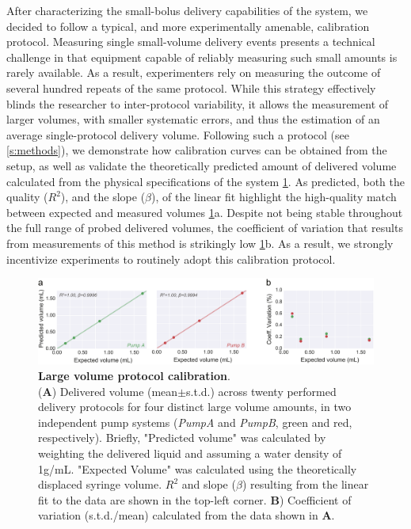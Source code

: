 After characterizing the small-bolus delivery capabilities of the system, we decided to follow a typical, and more experimentally amenable, calibration protocol. Measuring single small-volume delivery events presents a technical challenge in that equipment capable of reliably measuring such small amounts is rarely available. As a result, experimenters rely on measuring the outcome of several hundred repeats of the same protocol. While this strategy effectively blinds the researcher to inter-protocol variability, it allows the measurement of larger volumes, with smaller systematic errors, and thus the estimation of an average single-protocol delivery volume. Following such a protocol (see \ref{s:methods}), we demonstrate how calibration curves can be obtained from the setup, as well as validate the theoretically predicted amount of delivered volume calculated from the physical specifications of the system \ref{fig:LargeVolumeCalibration}. As predicted, both the quality  ($R^2$), and the slope ($\beta$), of the linear fit highlight the high-quality match between expected and measured volumes \ref{fig:LargeVolumeCalibration}a. Despite not being stable throughout the full range of probed delivered volumes, the coefficient of variation that results from measurements of this method is strikingly low \ref{fig:LargeVolumeCalibration}b. As a result, we strongly incentivize experiments to routinely adopt this calibration protocol.

\begin{figure}[ht] 
	\centering
	\includegraphics[width=1.0\linewidth]{Figures/Artboard 6.pdf}
	\caption{\textbf{Large volume protocol calibration}.\\
		(\textbf{A}) Delivered volume (mean$\pm$s.t.d.) across twenty performed delivery protocols for four distinct large volume amounts, in two independent pump systems (\textit{PumpA} and \textit{PumpB}, green and red, respectively). Briefly, "Predicted volume" was calculated by weighting the delivered liquid and assuming a water density of 1g/mL. "Expected Volume" was calculated using the theoretically displaced syringe volume.  $R^{2}$ and slope ($\beta$) resulting from the linear fit to the data are shown in the top-left corner. \textbf{B}) Coefficient of variation (s.t.d./mean) calculated from the data shown in \textbf{A}.}
	\label{fig:LargeVolumeCalibration} 
\end{figure}


